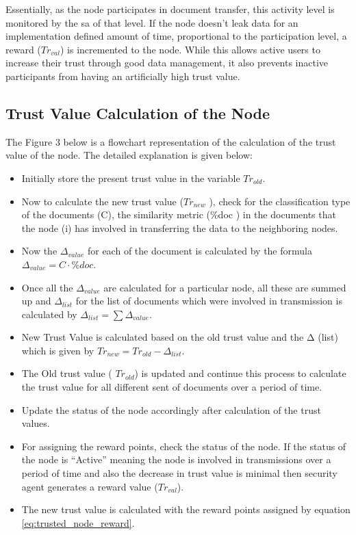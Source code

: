 Essentially, as the node participates in document transfer, this activity level
is monitored by the \gls{sa} of that level. If the node doesn't leak data for an
implementation defined amount of time, proportional to the participation level,
a reward (\(Tr_{val}\)) is incremented to the node. While this allows active
users to increase their trust through good data management, it also prevents inactive
participants from having an artificially high trust value. 
 \subsection{Trust Value Calculation of the Node}
The Figure 3 below is a flowchart representation of the calculation of the trust value of the node. The detailed explanation is given below:
\begin{itemize}
    \item Initially store the present trust value in the variable \( Tr_{old} \).
    \item Now to calculate the new trust value (\( Tr_{new} \) ), check for the
    classification type of the documents (C), the similarity metric (\%doc ) in
    the documents that the node (i) has involved in transferring the data to the
    neighboring nodes.  
    \item Now the \( \Delta_{value} \) for each of the document is calculated
    by the formula  \( \Delta_{value} = C \cdot \% doc \).
    \item Once all the \( \Delta_{value} \) are calculated for a particular node, all these are
    summed up and      \( \Delta_{list} \) for the list of documents which were involved in
    transmission is calculated by \( \Delta_{list} = \sum \Delta_{value} \).  
    \item New Trust Value is calculated based on the old trust value and the Δ (list)
        which is given by \( Tr_{new} = Tr_{old} - \Delta_{list} \).
    \item The Old trust value ( \(Tr_{old} \)) is updated and continue this process to
    calculate the trust value for all different sent of documents over a period
    of time.  
    \item Update the status of the node accordingly after calculation of the
    trust values.
    \item For assigning the reward points, check the status of the node. If the status
    of the node is “Active” meaning the node is involved in transmissions over
    a period of time and also the decrease in trust value is minimal then
    security agent generates a reward value      (\( Tr_{val} \)).  
    \item The new trust value is calculated with the reward points assigned by
        equation \ref{eq:trusted_node_reward}.
\end{itemize}

